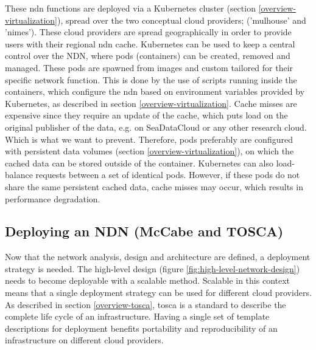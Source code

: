 
These \gls{ndn} functions are deployed via a Kubernetes cluster (section \ref{overview-virtualization}), spread over the two conceptual cloud providers; ('mulhouse' and 'nimes'). These cloud providers are spread geographically in order to provide users with their regional \gls{ndn} cache. Kubernetes can be used to keep a central control over the NDN, where pods (containers) can be created, removed and managed. These pods are spawned from images and custom tailored for their specific network function. This is done by the use of scripts running inside the containers, which configure the \gls{ndn} based on environment variables provided by Kubernetes, as described in section \ref{overview-virtualization}. Cache misses are expensive since they require an update of the cache, which puts load on the original publisher of the data, e.g. on SeaDataCloud or any other research cloud. Which is what we want to prevent. Therefore, pods preferably are configured with persistent data volumes (section \ref{overview-virtualization}), on which the cached data can be stored outside of the container. Kubernetes can also load-balance requests between a set of identical pods. However, if these pods do not share the same persistent cached data, cache misses may occur, which results in performance degradation.

\subsection{Deploying an NDN (McCabe and TOSCA)}
\label{planning-deploying}
Now that the network analysis, design and architecture are defined, a deployment strategy is needed. The high-level design (figure \ref{fig:high-level-network-design}) needs to become deployable with a scalable method. Scalable in this context means that a single deployment strategy can be used for different cloud providers. As described in section \ref{overview-tosca}, \gls{tosca} is a standard to describe the complete life cycle of an infrastructure. Having a single set of template descriptions for deployment benefits portability and reproducibility of an infrastructure on different cloud providers.


